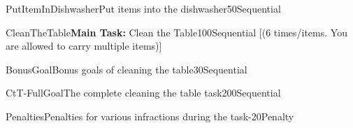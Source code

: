 \begin{Group}{PutItemInDishwasher}{Put items into the dishwasher}{50}{Sequential}
\end{Group}

\begin{Group}{CleanTheTable}{\textbf{\textcolor{myturquoise}{Main Task:}} Clean the Table}{100}{Sequential}
    [(6 times/items. You are allowed to carry multiple items)]
\end{Group}

\begin{Group}{BonusGoal}{Bonus goals of cleaning the table}{30}{Sequential}
\end{Group}

\begin{Group}{CtT-FullGoal}{The complete cleaning the table task}{200}{Sequential}
\end{Group}

\begin{Group}{Penalties}{Penalties for various infractions during the task}{-20}{Penalty}
\end{Group}